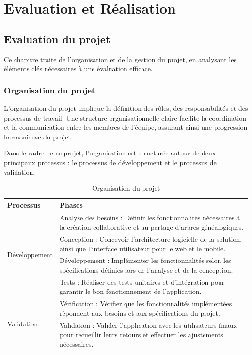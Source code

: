 \part{Evaluation et Réalisation}
\label{part:evaluation-et-realisation}
\chapter{Evaluation du projet}
Ce chapitre traite de l’organisation et de la gestion du projet, en analysant
les éléments clés nécessaires à une évaluation efficace.

\section{Organisation du projet}
L’organisation du projet implique la définition des rôles, des responsabilités
et des processus de travail. Une structure organisationnelle claire facilite
la coordination et la communication entre les membres de l’équipe, assurant
ainsi une progression harmonieuse du projet.

Dans le cadre de ce projet, l’organisation est structurée autour de deux
principaux processus : le processus de développement et le processus de
validation.

\begin{table}[htbp]
  \centering
  \begin{tabularx}{\textwidth}{|l|X|}
    \hline
    \textbf{Processus} & \textbf{Phases} \\ \hline
    \multirow{4}{*}{Développement} & Analyse des besoins : Définir les fonctionnalités nécessaires à la création collaborative et au partage d’arbres généalogiques. \\
     & Conception : Concevoir l'architecture logicielle de la solution, ainsi que l'interface utilisateur pour le web et le mobile. \\
     & Développement : Implémenter les fonctionnalités selon les spécifications définies lors de l'analyse et de la conception. \\
     & Tests : Réaliser des tests unitaires et d'intégration pour garantir le bon fonctionnement de l'application. \\ \hline
    \multirow{2}{*}{Validation} & Vérification : Vérifier que les fonctionnalités implémentées répondent aux besoins et aux spécifications du projet. \\
     & Validation : Valider l'application avec les utilisateurs finaux pour recueillir leurs retours et effectuer les ajustements nécessaires. \\ \hline
  \end{tabularx}
  \caption{Organisation du projet}
\end{table}

